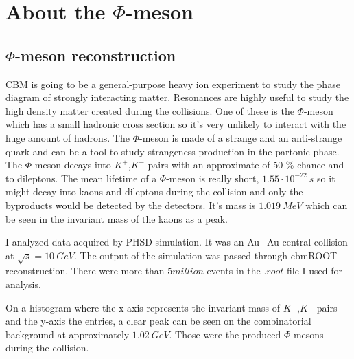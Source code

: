 \documentclass[a4paper,12pt]{article}
\begin{document}
\section{ About the $\Phi$-meson}
\subsection{ $\Phi$-meson reconstruction}
\vspace{5mm}
\par CBM is going to be a general-purpose heavy ion experiment to study the phase diagram of strongly interacting matter. Resonances are highly useful to study the high density matter created during the collisions. One of these is the $\Phi$-meson which has a small hadronic cross section so  it's  very unlikely to interact with the huge amount of hadrons. The $\Phi$-meson is made of a strange and an anti-strange quark and can be a tool to study strangeness production in the partonic phase. The $\Phi$-meson decays into $K^{+}$,$K^{-}$ pairs with an approximate of 50 \% chance and to dileptons. The mean lifetime of a $\Phi$-meson is really short, $1.55\cdot10^{-22}~s$ so it might decay into kaons and dileptons during the collision and only the byproducts would be detected by the detectors. It's mass is $1.019~MeV$ which can be seen in the invariant mass of the kaons as a peak.
\vspace{5mm}
\par I analyzed data acquired by PHSD simulation. It was an Au+Au central collision at $\sqrt{s} = 10~GeV$. The output of the simulation was passed through cbmROOT reconstruction. There were more than $5 million$ events in the $.root$ file I used for analysis.
\vspace{5mm}
\par On a histogram where the x-axis represents the invariant mass of $K^{+}$,$K^{-}$ pairs and the y-axis the entries, a clear peak can be seen on the combinatorial background at approximately $1.02~GeV$. Those were the produced $\Phi$-mesons during the collision.
\end{document}

